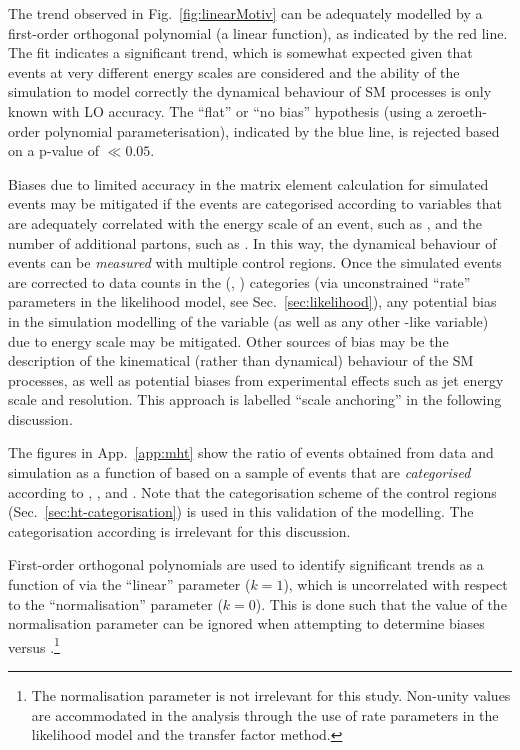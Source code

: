 The trend observed in Fig.~\ref{fig:linearMotiv} can be adequately
modelled by a first-order orthogonal polynomial (\ie a linear
function), as indicated by the red line. The fit indicates a
significant trend, which is somewhat expected given that events at
very different energy scales are considered and the ability of the
simulation to model correctly the dynamical behaviour of SM processes
is only known with LO accuracy. The ``flat'' or ``no bias'' hypothesis
(using a zeroeth-order polynomial parameterisation), indicated by the
blue line, is rejected based on a p-value of $\ll 0.05$.

Biases due to limited accuracy in the matrix element calculation for
simulated events may be mitigated if the events are categorised
according to variables that are adequately correlated with the energy
scale of an event, such as \scalht, and the number of additional
partons, such as \njet. In this way, the dynamical behaviour of events
can be {\it measured} with multiple control regions. Once the
simulated events are corrected to data counts in the (\njet, \scalht)
categories (via unconstrained ``rate'' parameters in the likelihood
model, see Sec.~\ref{sec:likelihood}), any potential bias in the
simulation modelling of the \mht variable (as well as any other
\met-like variable) due to energy scale may be mitigated. Other
sources of bias may be the description of the kinematical (rather than
dynamical) behaviour of the SM processes, as well as potential biases
from experimental effects such as jet energy scale and
resolution. This approach is labelled ``scale anchoring'' in the
following discussion. 

The figures in App.~\ref{app:mht} show the ratio of events obtained
from data and simulation as a function of \mht based on a sample of
\mj events that are {\it categorised} according to \njet, \scalht, and
\nb. Note that the \scalht categorisation scheme of the control
regions (Sec.~\ref{sec:ht-categorisation}) is used in this validation
of the \mht modelling. The categorisation according \nb is irrelevant
for this discussion.

First-order orthogonal polynomials are used to identify significant
trends as a function of \mht via the ``linear'' parameter ($k = 1$),
which is uncorrelated with respect to the ``normalisation'' parameter
($k = 0$). This is done such that the value of the normalisation
parameter can be ignored when attempting to determine biases versus
\mht.\footnote{The normalisation parameter is not irrelevant for this
  study. Non-unity values are accommodated in the analysis through the
  use of rate parameters in the likelihood model and the transfer
  factor method.}

